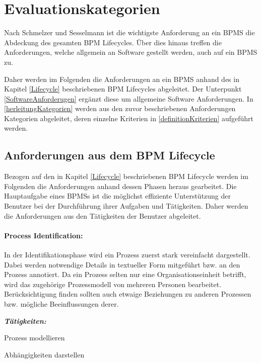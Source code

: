 
\section{Evaluationskategorien}
\label{kategorienGesamt}
Nach Schmelzer und Sesselmann ist die wichtigste Anforderung an ein \ac{BPMS} die Abdeckung des gesamten \ac{BPM} Lifecycles. \cite[S.468]{Schmelzer.2013} Über dies hinaus treffen die Anforderungen, welche allgemein an Software gestellt werden, auch auf ein \ac{BPMS} zu. 

\medskip\noindent Daher werden im Folgenden die Anforderungen an ein \ac{BPMS} anhand des in Kapitel \ref{Lifecycle} beschriebenen \ac{BPM} Lifecycles abgeleitet. Der Unterpunkt \ref{SoftwareAnforderugen} ergänzt diese um allgemeine Software Anforderungen. In \ref{herleitungKategorien} werden aus den zuvor beschriebenen Anforderungen Kategorien abgeleitet, deren einzelne Kriterien in \ref{definitionKriterien} aufgeführt werden.

\subsection{Anforderungen aus dem BPM Lifecycle}
\label{AnforderungenPhasen}
Bezogen auf den in Kapitel \ref{Lifecycle} beschriebenen \ac{BPM} Lifecycle werden im Folgenden die Anforderungen anhand dessen Phasen heraus gearbeitet. Die Hauptaufgabe eines \ac{BPMS}s ist die möglichst effiziente Unterstützung der Benutzer bei der Durchführung ihrer Aufgaben und Tätigkeiten. Daher werden die Anforderungen aus den Tätigkeiten der Benutzer abgeleitet.

\newpage
\paragraph*{Process Identification:}
In der Identifikationsphase wird ein Prozess zuerst stark vereinfacht dargestellt. Dabei werden notwendige Details in textueller Form mitgeführt bzw. an den Prozess annotiert. Da ein Prozess selten nur eine Organisationseinheit betrifft, wird das zugehörige Prozessmodell von mehreren Personen bearbeitet. Berücksichtigung finden sollten auch etwaige Beziehungen zu anderen Prozessen bzw. mögliche Beeinflussungen derer.

\medskip\textit{\textbf{Tätigkeiten:}}
\begin{compactitem}{}
\item[] Prozess modellieren
\item[] Abhängigkeiten darstellen
\end{compactitem}



